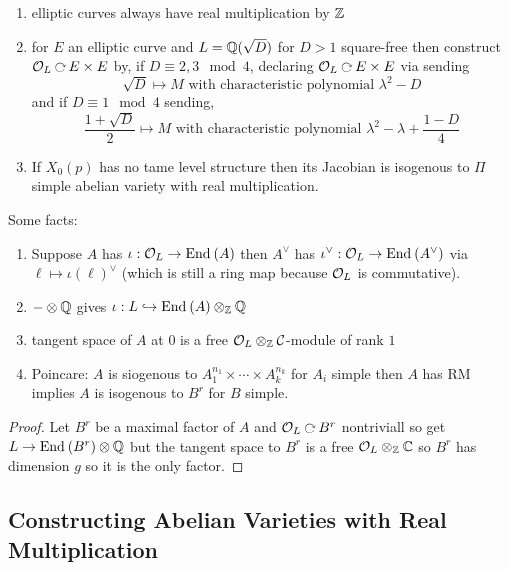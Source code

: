 \documentclass[12pt]{article}
\begin{document}
\begin{example}
\begin{enumerate}
\item elliptic curves always have real multiplication by $\mathbb{Z}$
\item for $E$ an elliptic curve and $L = \mathbb{Q}(\sqrt{D})$ for $D > 1$ square-free then construct $\cO_L \acts E \times E$ by, if $D \equiv 2,3 \mod 4$, declaring $\cO_L \acts E \times E$ via sending
\[ \sqrt{D} \mapsto M \text{ with characteristic polynomial }\lambda^2 - D \]
and if $D \equiv 1 \mod 4$ sending,
\[ \frac{1 + \sqrt{D}}{2} \mapsto M \text{ with characteristic polynomial } \lambda^2 - \lambda + \frac{1-D}{4} \]
\item If $X_0(p)$ has no tame level structure then its Jacobian is isogenous to $\Pi$ simple abelian variety with real multiplication.
\end{enumerate}
\end{example}


Some facts:
\begin{enumerate}
\item Suppose $A$ has $\iota : \mathcal{O}_L \to \mathrm{End}_{} \left( A \right)$ then $A^\vee$ has $\iota^\vee : \mathcal{O}_L \to \mathrm{End}_{} \left( A^\vee \right)$ via $\ell \mapsto \iota(\ell)^\vee$ (which is still a ring map because $\mathcal{O}_L$ is commutative). 

\item $- \otimes \mathbb{Q}$ gives $\iota : L \hookrightarrow \mathrm{End}_{} \left( A \right) \otimes_{\mathbb{Z}} {\mathbb{Q}}$

\item tangent space of $A$ at $0$ is a free $\mathcal{O}_L \otimes_{\mathbb{Z}} \mathcal{C}$-module of rank $1$

\item Poincare: $A$ is siogenous to $A_1^{n_1} \times \cdots \times A^{n_k}_k$ for $A_i$ simple then $A$ has RM implies $A$ is isogenous to $B^r$ for $B$ simple.
\end{enumerate}

\begin{proof}
Let $B^r$ be a maximal factor of $A$ and $\cO_L \acts B^r$ nontriviall so get $L \to \mathrm{End}_{} \left( B^r \right) \otimes \mathbb{Q}$ but the tangent space to $B^r$ is a free $\mathcal{O}_L \otimes_{\mathbb{Z}} \mathbb{C}$ so $B^r$ has dimension $g$ so it is the only factor. 
\end{proof}

\subsection{Constructing Abelian Varieties with Real Multiplication}
\end{document}
